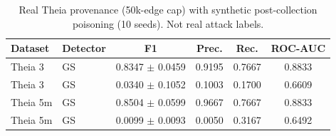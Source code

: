 \begin{table}[t]
\centering
\small
\caption{Real Theia provenance (50k-edge cap) with synthetic post-collection poisoning (10 seeds). Not real attack labels.}
\label{tab:realpoison}
\begin{tabular}{llcccc}
\toprule
Dataset & Detector & F1 & Prec. & Rec. & ROC-AUC \\
\midrule
Theia 3 & GS & 0.8347 $\pm$ 0.0459 & 0.9195 & 0.7667 & 0.8833 \\
Theia 3 & GS & 0.0340 $\pm$ 0.1052 & 0.1003 & 0.1700 & 0.6609 \\
Theia 5m & GS & 0.8504 $\pm$ 0.0599 & 0.9667 & 0.7667 & 0.8833 \\
Theia 5m & GS & 0.0099 $\pm$ 0.0093 & 0.0050 & 0.3167 & 0.6492 \\
\bottomrule
\end{tabular}
\end{table}
